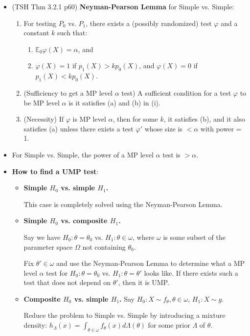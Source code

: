 \documentclass[twoside]{article}
\newcommand\bbE{\mathbb{E}}
\newcommand\Lmb{\Lambda}
\newcommand\om{\omega}
\newcommand\Om{\Omega}
\def\t{\theta}
\begin{document}
\begin{itemize}
\item (TSH Thm 3.2.1 p60) \textbf{Neyman-Pearson Lemma} for Simple vs. Simple: \begin{enumerate}[label=(\roman*)]
\item For testing $P_0$ vs. $P_1$, there exists a (possibly randomized) test $\varphi$ and a constant $k$ such that:
\begin{enumerate}
\item $\bbE_0 \varphi(X) = \alpha$, and
\item $\varphi(X) = 1$ if $p_1(X) > k p_0(X)$, and $\varphi(X) = 0$ if $p_1(X) < k p_0(X)$.
\end{enumerate}

\item (Sufficiency to get a MP level $\alpha$ test) A sufficient condition for a test $\varphi$ to be MP level $\alpha$ is it satisfies (a) and (b) in (i). 

\item (Necessity) If $\varphi$ is MP level $\alpha$, then for some $k$, it satisfies (b), and it also satisfies (a) unless there exists a test $\varphi'$ whose size is $< \alpha$ with power = 1.
\end{enumerate}

\item For Simple vs. Simple, the power of a MP level $\alpha$ test is $> \alpha$.

\item \textbf{How to find a UMP test}:
\begin{itemize}
\item \textbf{Simple $H_0$ vs. simple $H_1$.}

This case is completely solved using the Neyman-Pearson Lemma.

\item \textbf{Simple $H_0$ vs. composite $H_1$.}

Say we have $H_0: \t = \t_0$ vs. $H_1: \t \in \om$, where $\om$ is some subset of the parameter space $\Om$ not containing $\t_0$.

Fix $\t' \in \om$ and use the Neyman-Pearson Lemma to determine what a MP level $\alpha$ test for $H_0: \t = \t_0$ vs. $H_1: \t = \t'$ looks like. If there exists such a test that does not depend on $\t'$, then it is UMP.

\item \textbf{Composite $H_0$ vs. simple $H_1$.} 
Say $H_0: X \sim f_\t, \t \in \om$, $H_1: X \sim g$.

Reduce the problem to Simple vs. Simple by introducing a mixture density: $h_\Lmb(x) = \displaystyle\int_{\t \in \om} f_\t(x) d\Lmb(\t)$ for some prior $\Lmb$ of $\t$. 


\end{itemize}
\end{itemize}
\end{document}
